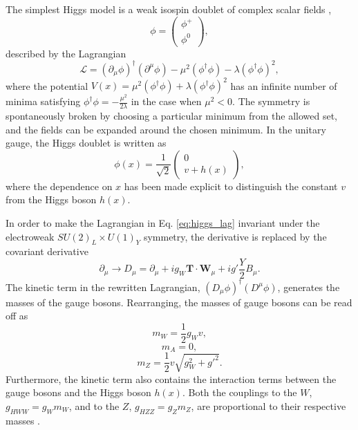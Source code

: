 The simplest Higgs model is a weak isospin doublet of complex scalar fields \cite{Thomson:2013zua},
\begin{equation}
\phi = \begin{pmatrix} \phi^+ \\ \phi^0 \end{pmatrix},
\end{equation}
described by the Lagrangian
\begin{equation}
\mathcal{L} = (\partial_\mu \phi)^\dag (\partial^\mu \phi) - \mu^2(\phi^\dag\phi) - \lambda(\phi^\dag \phi)^2,
\label{eq:higgs_lag}
\end{equation}
where the potential $V(x) = \mu^2(\phi^\dag\phi) + \lambda(\phi^\dag \phi)^2$
has an infinite number of minima satisfying $\phi^\dag \phi = -\frac{\mu^2}{2\lambda}$
in the case when $\mu^2 < 0$. The symmetry is spontaneously broken by choosing a
particular minimum from the allowed set, and the fields can be expanded around the chosen minimum.
In the unitary gauge, the Higgs doublet is written as
\begin{equation}
\phi(x) = \frac{1}{\sqrt{2}} \begin{pmatrix} 0 \\ v + h(x) \end{pmatrix},
\end{equation}
where the dependence on $x$ has been made explicit to distinguish the constant
$v$ from the Higgs boson $h(x)$.

In order to make the Lagrangian in Eq. \ref{eq:higgs_lag} invariant under the electroweak
$SU(2)_L \times U(1)_Y$ symmetry, the derivative is replaced by the covariant
derivative \cite{Thomson:2013zua}
\begin{equation}
\partial_\mu \rightarrow D_\mu = \partial_\mu + i g_W \mathbf{T} \cdot \mathbf{W}_\mu
+ i g' \frac{Y}{2} B_\mu.
\end{equation}
The kinetic term in the rewritten Lagrangian, $(D_\mu \phi)^\dag (D^\mu \phi)$, generates the
masses of the gauge bosons. Rearranging, the masses of gauge bosons can be read off as
\begin{equation}
m_W = \frac{1}{2} g_W v,
\end{equation}
\begin{equation}
m_A = 0,
\end{equation}
\begin{equation}
m_Z = \frac{1}{2}v\sqrt{g_W^2 + g'^2}.
\end{equation}
Furthermore, the kinetic term also contains the interaction terms between the gauge bosons
and the Higgs boson $h(x)$. Both the couplings to the $W$, $g_{HWW}=g_W m_W$, and to the $Z$,
$g_{HZZ} = g_Z m_Z$, are proportional to their respective masses \cite{Thomson:2013zua}.

